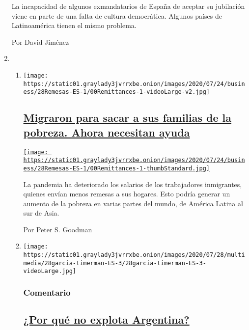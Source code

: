 \begin{enumerate}
  La incapacidad de algunos exmandatarios de España de aceptar su
  jubilación viene en parte de una falta de cultura democrática. Algunos
  países de Latinoamérica tienen el mismo problema.

  Por David Jiménez
\item
  \begin{enumerate}
  \def\labelenumii{\arabic{enumii}.}
  \item
    \texttt{[image: https://static01.graylady3jvrrxbe.onion/images/2020/07/24/business/28Remesas-ES-1/00Remittances-1-videoLarge-v2.jpg]}

    \hypertarget{migraron-para-sacar-a-sus-familias-de-la-pobreza-ahora-necesitan-ayuda}{%
    \subsection{\texorpdfstring{\href{/es/2020/07/28/espanol/mundo/remesas-coronavirus.html}{Migraron
    para sacar a sus familias de la pobreza. Ahora necesitan
    ayuda}}{Migraron para sacar a sus familias de la pobreza. Ahora necesitan ayuda}}\label{migraron-para-sacar-a-sus-familias-de-la-pobreza-ahora-necesitan-ayuda}}

    \href{/es/2020/07/28/espanol/mundo/remesas-coronavirus.html}{\texttt{[image: https://static01.graylady3jvrrxbe.onion/images/2020/07/24/business/28Remesas-ES-1/00Remittances-1-thumbStandard.jpg]}}

    La pandemia ha deteriorado los salarios de los trabajadores
    inmigrantes, quienes envían menos remesas a sus hogares. Esto podría
    generar un aumento de la pobreza en varias partes del mundo, de
    América Latina al sur de Asia.

    Por Peter S. Goodman
  \item
    \texttt{[image: https://static01.graylady3jvrrxbe.onion/images/2020/07/28/multimedia/28garcia-timerman-ES-3/28garcia-timerman-ES-3-videoLarge.jpg]}

    \hypertarget{comentario-1}{%
    \subsubsection{Comentario}\label{comentario-1}}

    \hypertarget{por-quuxe9-no-explota-argentina}{%
    \subsection{\texorpdfstring{\href{/es/2020/07/28/espanol/opinion/argentina-estallido-2001-coronavirus.html}{¿Por
    qué no explota
    Argentina?}}{¿Por qué no explota Argentina?}}\label{por-quuxe9-no-explota-argentina}}


\end{enumerate}
\end{enumerate}
